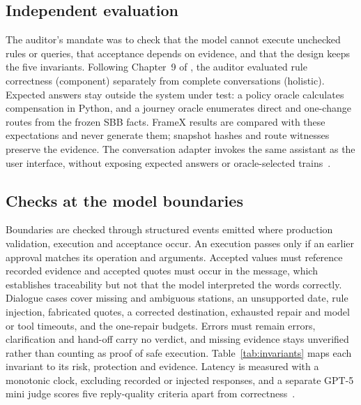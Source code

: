 

\subsection{Independent evaluation}

The auditor's mandate was to check that the model cannot execute unchecked rules or queries, that acceptance depends on evidence, and that the design keeps the five invariants. Following Chapter~9 of \citet{albada2025agents}, the auditor evaluated rule correctness (component) separately from complete conversations (holistic). Expected answers stay outside the system under test: a policy oracle calculates compensation in Python, and a journey oracle enumerates direct and one-change routes from the frozen SBB facts. FrameX results are compared with these expectations and never generate them; snapshot hashes and route witnesses preserve the evidence. The conversation adapter invokes the same assistant as the user interface, without exposing expected answers or oracle-selected trains~\citep{h2evaluation}.

\subsection{Checks at the model boundaries}

Boundaries are checked through structured events emitted where production validation, execution and acceptance occur. An execution passes only if an earlier approval matches its operation and arguments. Accepted values must reference recorded evidence and accepted quotes must occur in the message, which establishes traceability but not that the model interpreted the words correctly. Dialogue cases cover missing and ambiguous stations, an unsupported date, rule injection, fabricated quotes, a corrected destination, exhausted repair and model or tool timeouts, and the one-repair budgets. Errors must remain errors, clarification and hand-off carry no verdict, and missing evidence stays unverified rather than counting as proof of safe execution. Table~\ref{tab:invariants} maps each invariant to its risk, protection and evidence. Latency is measured with a monotonic clock, excluding recorded or injected responses, and a separate GPT-5 mini judge scores five reply-quality criteria apart from correctness~\citep{h2evaluation}.


